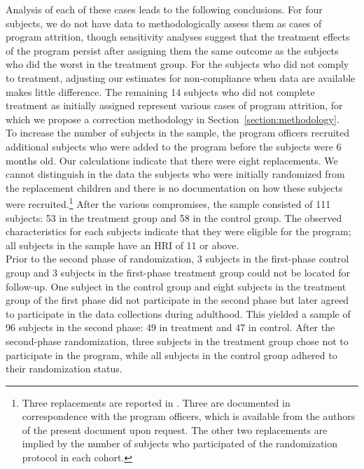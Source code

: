\begin{appendices}
\noindent Analysis of each of these cases leads to the following conclusions. For four subjects, we do not have data to methodologically assess them as cases of program attrition, though sensitivity analyses suggest that the treatment effects of the program persist after assigning them the same outcome as the subjects who did the worst in the treatment group. For the subjects who did not comply to treatment, adjusting our estimates for non-compliance when data are available makes little difference. The remaining 14 subjects who did not complete treatment as initially assigned represent various cases of program attrition, for which we propose a correction methodology in Section~\ref{section:methodology}.\\

\noindent To increase the number of subjects in the sample, the program officers recruited additional subjects who were added to the program before the subjects were 6 months old. Our calculations indicate that there were eight replacements. We cannot distinguish in the data the subjects who were initially randomized from the replacement children and there is no documentation on how these subjects were recruited.\footnote{Three replacements are reported in \citet{Ramey_Campbell_1979_SR}. Three are documented in correspondence with the program officers, which is available from the authors of the present document upon request. The other two replacements are implied by the number of subjects who participated of the randomization protocol in each cohort.} After the various compromises, the sample consisted of 111 subjects: 53 in the treatment group and 58 in the control group. The observed characteristics for each subjects indicate that they were eligible for the program; all subjects in the sample have an HRI of 11 or above. \\

\noindent Prior to the second phase of randomization, 3 subjects in the first-phase control group and 3 subjects in the first-phase treatment group could not be located for follow-up. One subject in the control group and eight subjects in the treatment group of the first phase did not participate in the second phase but later agreed to participate in the data collections during adulthood. This yielded a sample of 96 subjects in the second phase: 49 in treatment and 47 in control. After the second-phase randomization, three subjects in the treatment group chose not to participate in the program, while all subjects in the control group adhered to their randomization status. \\


\end{appendices}
